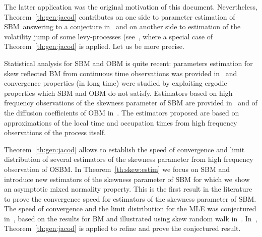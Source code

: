 \documentclass[12pt]{article}
\numberwithin{equation}{section}
\theoremstyle{definition}
\theoremstyle{remark}
\begin{document}
The latter application was the original motivation of this document. Nevertheless, Theorem~\ref{th:gen:jacod} contributes on one side to 
parameter estimation of SBM~answering to a conjecture in~\cite{lmt1} %
and on another side to estimation of the volatility jump of some levy-processes (see~\cite{robert_2023}, where a special case of Theorem~\ref{th:gen:jacod} is applied. 
Let us be more precise. 

Statistical analysis for SBM and OBM is quite recent: parameters estimation for skew reflected BM from continuous time observations was provided in~\cite{bardou2010statistical} and convergence properties (in long time) were studied by exploiting ergodic properties which SBM and OBM do not satisfy. 
Estimators based on high frequency observations of the skewness parameter of SBM are provided in~\cite{lmt,lmt1} and of the diffusion coefficients of OBM in~\cite{lp}. The estimators proposed are based on 
approximations of the local time and occupation times from high frequency observations of the process itself. 

Theorem~\ref{th:gen:jacod}
allows to establish 
the speed of convergence and limit distribution of several estimators of the skewness parameter from high frequency observation of OSBM.
In Theorem~\ref{th:skew:estim} we focus on SBM and introduce new estimators of the skewness parameter of SBM for which we show an asymptotic mixed normality property. 
This is the first result in the literature to prove the convergence speed for estimators of the skewness parameter of SBM.
The speed of convergence and the limit distribution for the MLE was conjectured in~\cite{lmt1}, based on the results for BM and illustrated using skew random walk in~\cite{lejay2018estimation}. 
In~\cite{lm23}, Theorem~\ref{th:gen:jacod} is applied to refine and prove the conjectured result.
%
%
%
%
\end{document}
